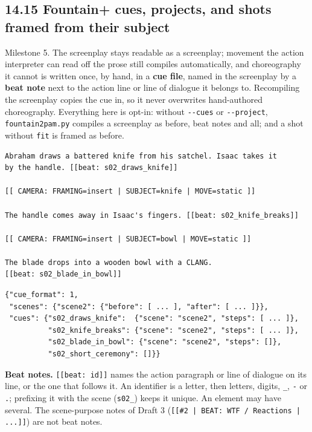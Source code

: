 \documentclass[
  12pt,
  letterpaper,
]{book}
\begin{document}
\subsection{14.15 Fountain+ cues, projects, and shots framed from their
subject}\label{fountain-cues}

Milestone 5. The screenplay stays readable as a screenplay; movement
the action interpreter can read off the prose still compiles
automatically, and choreography it cannot is written once, by hand, in
a \textbf{cue file}, named in the screenplay by a \textbf{beat note}
next to the action line or line of dialogue it belongs to. Recompiling
the screenplay copies the cue in, so it never overwrites hand-authored
choreography. Everything here is opt-in: without \texttt{-{}-cues} or
\texttt{-{}-project}, \texttt{fountain2pam.py} compiles a screenplay as
before, beat notes and all; and a shot without \texttt{fit} is framed as
before.

\begin{verbatim}
Abraham draws a battered knife from his satchel. Isaac takes it
by the handle. [[beat: s02_draws_knife]]

[[ CAMERA: FRAMING=insert | SUBJECT=knife | MOVE=static ]]

The handle comes away in Isaac's fingers. [[beat: s02_knife_breaks]]

[[ CAMERA: FRAMING=insert | SUBJECT=bowl | MOVE=static ]]

The blade drops into a wooden bowl with a CLANG.
[[beat: s02_blade_in_bowl]]
\end{verbatim}

\begin{verbatim}
{"cue_format": 1,
 "scenes": {"scene2": {"before": [ ... ], "after": [ ... ]}},
 "cues": {"s02_draws_knife":  {"scene": "scene2", "steps": [ ... ]},
          "s02_knife_breaks": {"scene": "scene2", "steps": [ ... ]},
          "s02_blade_in_bowl": {"scene": "scene2", "steps": []},
          "s02_short_ceremony": []}}
\end{verbatim}

\textbf{Beat notes.} \texttt{[[beat: id]]} names the action paragraph or
line of dialogue on its line, or the one that follows it. An identifier
is a letter, then letters, digits, \texttt{\_}, \texttt{-} or
\texttt{.}; prefixing it with the scene (\texttt{s02\_}) keeps it unique.
An element may have several. The scene-purpose notes of Draft 3
(\texttt{[[\#2 | BEAT: WTF / Reactions | ...]]}) are not beat notes.
\end{document}

